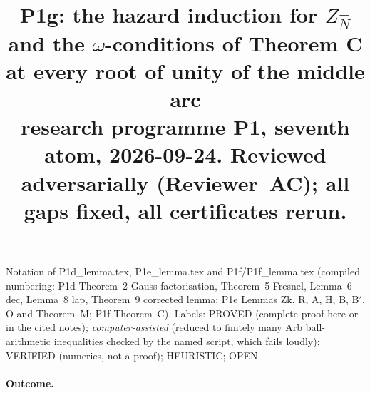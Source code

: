 \documentclass[11pt]{article}
\title{P1g: the hazard induction for $Z^\pm_N$ and the $\omega$-conditions of Theorem C\\ at every root of unity of the middle arc\\ \small research programme P1, seventh atom, 2026-09-24. Reviewed adversarially (Reviewer~AC); all gaps fixed, all certificates rerun.}
\date{}
\theoremstyle{definition}\newtheorem{definition}[theorem]{Definition}
\theoremstyle{remark}\newtheorem{remark}[theorem]{Remark}
\begin{document}
\maketitle

Notation of P1d\_lemma.tex, P1e\_lemma.tex and P1f/P1f\_lemma.tex (compiled numbering: P1d Theorem~2 Gauss factorisation, Theorem~5 Fresnel, Lemma~6 dec, Lemma~8 lap, Theorem~9 corrected lemma; P1e Lemmas Zk, R, A, H, B, B$'$, O and Theorem~M; P1f Theorem~C).
Labels: PROVED (complete proof here or in the cited notes); \emph{computer-assisted} (reduced to finitely many Arb ball-arithmetic inequalities checked by the named script, which fails loudly); VERIFIED (numerics, not a proof); HEURISTIC; OPEN.

\paragraph{Outcome.}
\end{document}

